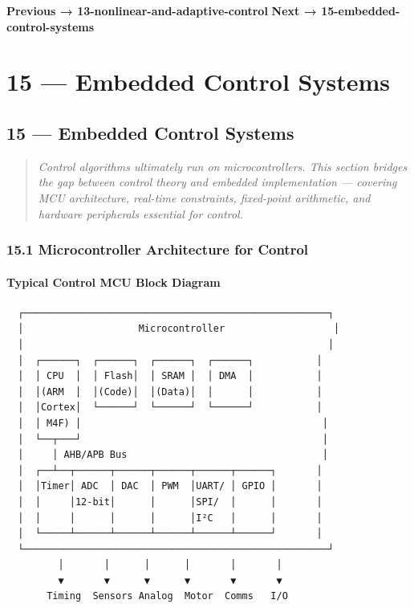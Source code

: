 \documentclass[11pt,a4paper]{book}
\begin{document}
\begin{itemize}
\medskip\noindent\hrulefill\medskip

\textbf{Previous → 13-nonlinear-and-adaptive-control}  
\textbf{Next → 15-embedded-control-systems}


\chapter{15 — Embedded Control Systems}
\section{15 — Embedded Control Systems}

\begin{quote}
\textit{Control algorithms ultimately run on microcontrollers. This section bridges the gap between control theory and embedded implementation — covering MCU architecture, real-time constraints, fixed-point arithmetic, and hardware peripherals essential for control.}
\end{quote}

\medskip\noindent\hrulefill\medskip

\subsection{15.1 Microcontroller Architecture for Control}

\subsubsection{Typical Control MCU Block Diagram}

\begin{lstlisting}
  ┌─────────────────────────────────────────────────────┐
  │                    Microcontroller                   │
  │                                                     │
  │  ┌──────┐  ┌──────┐  ┌──────┐  ┌──────┐           │
  │  │ CPU  │  │ Flash│  │ SRAM │  │ DMA  │           │
  │  │(ARM  │  │(Code)│  │(Data)│  │      │           │
  │  │Cortex│  └──────┘  └──────┘  └──────┘           │
  │  │ M4F) │                                          │
  │  └──┬───┘                                          │
  │     │ AHB/APB Bus                                  │
  │  ┌──┴──┬──────┬──────┬──────┬──────┬──────┐       │
  │  │Timer│ ADC  │ DAC  │ PWM  │UART/ │ GPIO │       │
  │  │     │12-bit│      │      │SPI/  │      │       │
  │  │     │      │      │      │I²C   │      │       │
  │  └─────┴──────┴──────┴──────┴──────┴──────┘       │
  └─────────────────────────────────────────────────────┘
         │       │      │      │       │       │
         ▼       ▼      ▼      ▼       ▼       ▼
       Timing  Sensors Analog  Motor  Comms   I/O
\end{lstlisting}


\end{itemize}
\end{document}
